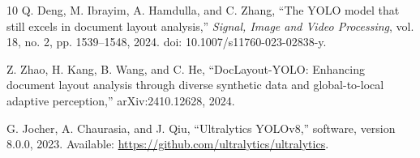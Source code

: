 \documentclass[12pt]{article}
\begin{document}
\begin{thebibliography}{10}
Q. Deng, M. Ibrayim, A. Hamdulla, and C. Zhang, ``The YOLO model that still excels in document layout analysis,'' \emph{Signal, Image and Video Processing}, vol. 18, no. 2, pp. 1539--1548, 2024. doi: 10.1007/s11760-023-02838-y.

Z. Zhao, H. Kang, B. Wang, and C. He, ``DocLayout-YOLO: Enhancing document layout analysis through diverse synthetic data and global-to-local adaptive perception,'' arXiv:2410.12628, 2024.

G. Jocher, A. Chaurasia, and J. Qiu, ``Ultralytics YOLOv8,'' software, version 8.0.0, 2023. Available: \url{https://github.com/ultralytics/ultralytics}.

\end{thebibliography}
\end{document}
